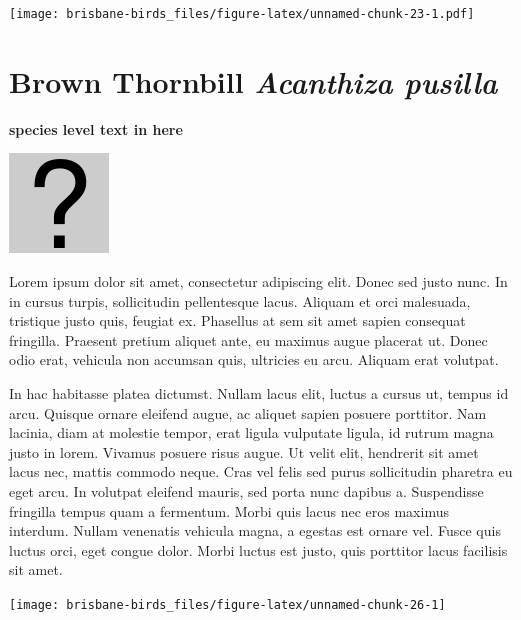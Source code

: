 \documentclass[]{book}
\let\origfigure\figure
\let\endorigfigure\endfigure
\renewenvironment{figure}[1][2] {
  \expandafter\origfigure\expandafter[H]
} {
  \endorigfigure
}
\begin{document}
\begin{figure}
\centering
\texttt{[image: brisbane-birds\_files/figure-latex/unnamed-chunk-23-1.pdf]}
\caption{\label{fig:unnamed-chunk-23}insert figure caption}
\end{figure}

\section{\texorpdfstring{Brown Thornbill \emph{Acanthiza
pusilla}}{Brown Thornbill Acanthiza pusilla}}\label{brown-thornbill-acanthiza-pusilla}

\textbf{species level text in here}

\begin{figure}
\centering
\includegraphics{assets/missing.png}
\caption{No image for species}
\end{figure}

Lorem ipsum dolor sit amet, consectetur adipiscing elit. Donec sed justo
nunc. In in cursus turpis, sollicitudin pellentesque lacus. Aliquam et
orci malesuada, tristique justo quis, feugiat ex. Phasellus at sem sit
amet sapien consequat fringilla. Praesent pretium aliquet ante, eu
maximus augue placerat ut. Donec odio erat, vehicula non accumsan quis,
ultricies eu arcu. Aliquam erat volutpat.

In hac habitasse platea dictumst. Nullam lacus elit, luctus a cursus ut,
tempus id arcu. Quisque ornare eleifend augue, ac aliquet sapien posuere
porttitor. Nam lacinia, diam at molestie tempor, erat ligula vulputate
ligula, id rutrum magna justo in lorem. Vivamus posuere risus augue. Ut
velit elit, hendrerit sit amet lacus nec, mattis commodo neque. Cras vel
felis sed purus sollicitudin pharetra eu eget arcu. In volutpat eleifend
mauris, sed porta nunc dapibus a. Suspendisse fringilla tempus quam a
fermentum. Morbi quis lacus nec eros maximus interdum. Nullam venenatis
vehicula magna, a egestas est ornare vel. Fusce quis luctus orci, eget
congue dolor. Morbi luctus est justo, quis porttitor lacus facilisis sit
amet.

\begin{figure}
\texttt{[image: brisbane-birds\_files/figure-latex/unnamed-chunk-26-1]} \caption{insert figure caption}\label{fig:unnamed-chunk-26}
\end{figure}
\end{document}
